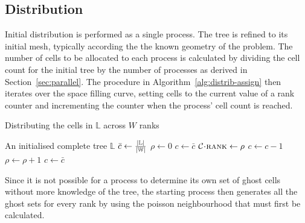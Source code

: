 \documentclass[twoside]{IIBproject}
\newcommand{\acc}{{\mkern 0.5mu\cdot\mkern 0.5mu}}
\numberwithin{figure}{section}
\begin{document}


    \subsection{Distribution} %
        \label{sec:distribution}

        Initial distribution is performed as a single process. The tree is refined to its initial mesh, typically according the the known geometry of the problem. The number of cells to be allocated to each process is calculated by dividing the cell count for the initial tree by the number of processes as derived in Section~\ref{sec:parallel}. The procedure in Algorithm~\ref{alg:distrib-assign} then iterates over the space filling curve, setting cells to the current value of a rank counter and incrementing the counter when the process' cell count is reached.

        \begin{algorithm}[!htbp]
            \caption{Distributing the cells in $\mathbb{L}$ across $W$ ranks}
            \label{alg:distrib-assign}

            \begin{algorithmic}
                \Require An initialised complete tree $\mathbb{L}$
                \Statex
                \State $\bar{c} \gets \frac{\abs{\mathbb{L}}}{\abs{\mathbb{W}}}$ 
                \State $\rho \gets 0$ 
                \State $c \gets \bar c$ 
                    \State $\mathcal{C}\acc\textproc{rank} \gets \rho$
                    \State $c \gets c-1$
                     
                        \State $\rho \gets \rho+1$
                        \State $c \gets \bar c$
                    \EndIf
                \EndFor
            \end{algorithmic}
        \end{algorithm}

        Since it is not possible for a process to determine its own set of ghost cells without more knowledge of the tree, the starting process then generates all the ghost sets for every rank by using the poisson neighbourhood that must first be calculated. 
\end{document}
